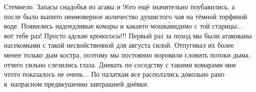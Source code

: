 Стемнело. Запасы снадобья из агавы и 96\sdash го ещё значительно поубавились, а после было выпито неимоверное количество душистого чая на тёмной торфяной воде. Появились надоедливые комары и какая\sdash то мошк\'{а}\mdash  видимо с той старицы$\ldots$ вот тебе раз! Просто адские \textit{кровососы}!!! Первый раз за поход мы были атакованы насекомыми с такой несвойственной для августа силой. Отпугивал их более менее только дым костра, поэтому мы постоянно норовили словить потоки дыма, отчего сильно слезились глаза. Дневать по соседству с такими комарами мне что\sdash то показалось не очень$\ldots$ По палаткам все расползлись довольно рано в~напрасном предвкушении завтрашней днёвки. 

\begin{center}
\end{center}
